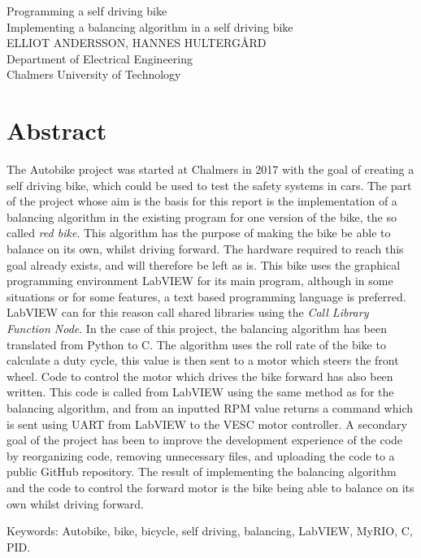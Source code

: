 Programming a self driving bike\\
Implementing a balancing algorithm in a self driving bike\\
ELLIOT ANDERSSON, HANNES HULTERGÅRD\\
Department of Electrical Engineering\\
Chalmers University of Technology \setlength{\parskip}{0.5cm}

\thispagestyle{plain}			%
\setlength{\parskip}{0pt plus 1.0pt}
\section*{Abstract}
The Autobike project was started at Chalmers in 2017 with the goal of creating a
self driving bike, which could be used to test the safety systems in cars. The part of the project whose aim is the basis for this report is the implementation of a balancing algorithm in the existing program for one version of the bike, the so called \textit{red bike}. This algorithm has the purpose of making the bike be able to balance on its own, whilst driving forward. The hardware required to reach this goal already exists, and will therefore be left as is. This bike uses the graphical programming environment LabVIEW for its main program, although in some situations or for some features, a text based programming language is preferred. LabVIEW can for this reason call shared libraries using the \textit{Call Library Function Node}. In the case of this project, the balancing algorithm has been translated from Python to C. The algorithm uses the roll rate of the bike to calculate a duty cycle, this value is then sent to a motor which steers the front wheel. Code to control the motor which drives the bike forward has also been written. This code is called from LabVIEW using the same method as for the balancing algorithm, and from an inputted RPM value returns a command which is sent using UART from LabVIEW to the VESC motor controller. A secondary goal of the project has been to improve the development experience of the code by reorganizing code, removing unnecessary files, and uploading the code to a public GitHub repository. The result of implementing the balancing algorithm and the code to control the forward motor is the bike being able to balance on its own whilst driving forward.

\vfill
Keywords: Autobike, bike, bicycle, self driving, balancing, LabVIEW, MyRIO, C, PID.

\newpage				%
\thispagestyle{empty}
\mbox{}